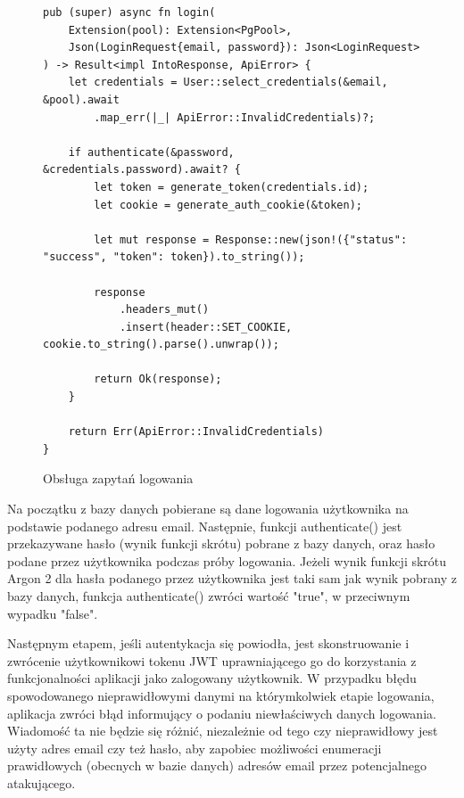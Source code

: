 \documentclass[a4paper,twoside,12pt]{book}
\begin{document}
\begin{figure}[H]
\centering
\begin{lstlisting}
pub (super) async fn login(
    Extension(pool): Extension<PgPool>,
    Json(LoginRequest{email, password}): Json<LoginRequest>
) -> Result<impl IntoResponse, ApiError> {
    let credentials = User::select_credentials(&email, &pool).await
        .map_err(|_| ApiError::InvalidCredentials)?;
    
    if authenticate(&password, &credentials.password).await? {
        let token = generate_token(credentials.id);
        let cookie = generate_auth_cookie(&token);

        let mut response = Response::new(json!({"status": "success", "token": token}).to_string());

        response
            .headers_mut()
            .insert(header::SET_COOKIE, cookie.to_string().parse().unwrap());

        return Ok(response);
    }

    return Err(ApiError::InvalidCredentials)
}
\end{lstlisting}
\caption{Obsługa zapytań logowania}
\label{fig:pseudokod:logowanie}
\end{figure}

Na początku z bazy danych pobierane są dane logowania użytkownika na podstawie podanego
adresu email. Następnie, funkcji authenticate() jest przekazywane hasło (wynik funkcji skrótu)
pobrane z bazy danych, oraz hasło podane przez użytkownika podczas próby logowania. 
Jeżeli wynik funkcji skrótu Argon 2 dla hasła podanego przez użytkownika jest taki sam
jak wynik pobrany z bazy danych, funkcja authenticate() zwróci wartość "true", w przeciwnym
wypadku "false". 

Następnym etapem, jeśli autentykacja się powiodła, jest skonstruowanie i zwrócenie
użytkownikowi tokenu JWT uprawniającego go do korzystania z funkcjonalności aplikacji
jako zalogowany użytkownik. W przypadku błędu spowodowanego nieprawidłowymi danymi
na którymkolwiek etapie logowania, aplikacja zwróci błąd informujący o podaniu niewłaściwych
danych logowania. Wiadomość ta nie będzie się różnić, niezależnie od tego czy nieprawidłowy
jest użyty adres email czy też hasło, aby zapobiec możliwości enumeracji prawidłowych
(obecnych w bazie danych) adresów email przez potencjalnego atakującego.

\end{document}

